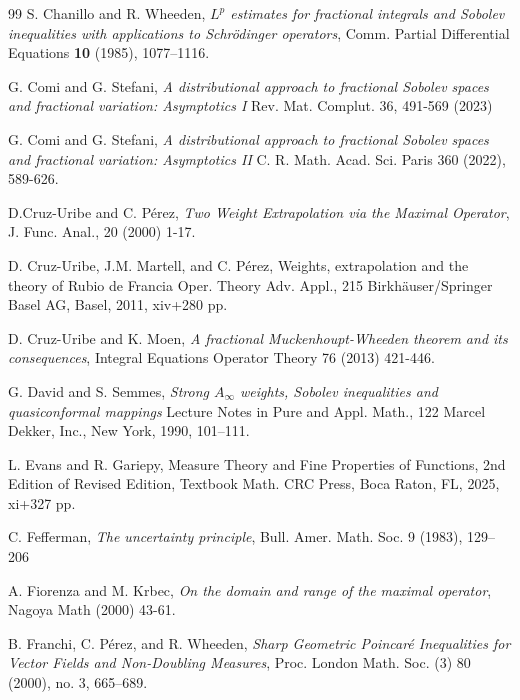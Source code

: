 \documentclass[11pt, a4paper, reqno]{amsart}
\theoremstyle{definition}
\theoremstyle{remark}
\begin{document}
\begin{thebibliography}{99}
{S. Chanillo and R. Wheeden, {\em $L^{p}$ estimates for fractional
integrals and Sobolev inequalities with applications to
Schr\"odinger operators}, Comm. Partial Differential Equations
{\bf 10} (1985), 1077--1116.}





 G. Comi and G. Stefani, \emph{A distributional approach to fractional Sobolev spaces and fractional variation: Asymptotics I} Rev. Mat. Complut. 36, 491-569 (2023)

 G. Comi and G. Stefani, \emph{A distributional approach to fractional Sobolev spaces and fractional variation: Asymptotics II} C. R. Math. Acad. Sci. Paris 360 (2022), 589-626.

 D.Cruz-Uribe and C. P\'erez, \emph{Two Weight Extrapolation via the Maximal Operator}, J. Func. Anal., 20 (2000) 1-17.


 D. Cruz-Uribe, J.M. Martell, and C. P\'erez, {Weights, extrapolation and the theory of Rubio de Francia} Oper. Theory Adv. Appl., 215 Birkhäuser/Springer Basel AG, Basel, 2011, xiv+280 pp. 

 D. Cruz-Uribe and K. Moen, \emph{A fractional Muckenhoupt-Wheeden theorem and its consequences}, Integral Equations Operator Theory 76 (2013) 421-446.


 G. David and S. Semmes, \emph{Strong $A_\infty$ weights, Sobolev inequalities and quasiconformal mappings} Lecture Notes in Pure and Appl. Math., 122 Marcel Dekker, Inc., New York, 1990, 101--111.


 L. Evans and R. Gariepy, Measure Theory and Fine Properties of Functions, 2nd Edition of Revised Edition, Textbook Math.
CRC Press, Boca Raton, FL, 2025, xi+327 pp.

 C. Fefferman, \emph{The uncertainty principle}, Bull. Amer. Math. Soc. 9 (1983), 129--206

 A. Fiorenza and M. Krbec, \emph{On the domain and range of the maximal operator}, Nagoya Math
(2000) 43-61.

 B. Franchi, C. P\'erez, and R. Wheeden, \emph{Sharp Geometric Poincaré Inequalities for Vector Fields and Non-Doubling Measures}, Proc. London Math. Soc. (3) 80 (2000), no. 3, 665--689.


\end{thebibliography}
\end{document}
